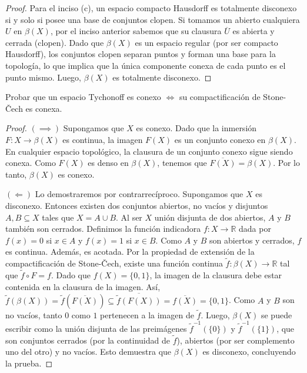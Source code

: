 \documentclass{article}
\theoremstyle{plain}
\theoremstyle{definition}
\newenvironment{ejercicio}[1]{\begin{trivlist}
\item[\hskip \labelsep {\bfseries Ejercicio}\hskip \labelsep {\bfseries #1.}]}{\end{trivlist}}
\begin{document}
\begin{proof}
    Para el inciso (c), un espacio compacto Hausdorff es totalmente disconexo si y solo si posee una base de conjuntos clopen. Si tomamos un abierto cualquiera \( U \) en \( \beta(X) \), por el inciso anterior sabemos que su clausura \( \overline{U} \) es abierta y cerrada (clopen). Dado que \( \beta(X) \) es un espacio regular (por ser compacto Hausdorff), los conjuntos clopen separan puntos y forman una base para la topología, lo que implica que la única componente conexa de cada punto es el punto mismo. Luego, \( \beta(X) \) es totalmente disconexo.
\end{proof}

\begin{ejercicio}{16}
    Probar que un espacio Tychonoff es conexo \( \iff \) su compactificación de Stone-Čech es conexa.
\end{ejercicio}
\begin{proof}
    \( (\implies) \) Supongamos que \( X \) es conexo. Dado que la inmersión \( F: X \to \beta(X) \) es continua, la imagen \( F(X) \) es un conjunto conexo en \( \beta(X) \). En cualquier espacio topológico, la clausura de un conjunto conexo sigue siendo conexa. Como \( F(X) \) es denso en \( \beta(X) \), tenemos que \( \overline{F(X)} = \beta(X) \). Por lo tanto, \( \beta(X) \) es conexo.

    \( (\Longleftarrow) \) Lo demostraremos por contrarrecíproco. Supongamos que \( X \) es disconexo. Entonces existen dos conjuntos abiertos, no vacíos y disjuntos \( A, B \subseteq X \) tales que \( X = A \cup B \). Al ser \( X \) unión disjunta de dos abiertos, \( A \) y \( B \) también son cerrados.
    Definimos la función indicadora \( f: X \to \mathbb{R} \) dada por \( f(x) = 0 \) si \( x \in A \) y \( f(x) = 1 \) si \( x \in B \). Como \( A \) y \( B \) son abiertos y cerrados, \( f \) es continua. Además, es acotada. Por la propiedad de extensión de la compactificación de Stone-Čech, existe una función continua \( \tilde{f}: \beta(X) \to \mathbb{R} \) tal que \( \tilde{f} \circ F = f \).
    Dado que \( f(X) = \{0, 1\} \), la imagen de la clausura debe estar contenida en la clausura de la imagen. Así, \( \tilde{f}(\beta(X)) = \tilde{f}(\overline{F(X)}) \subseteq \overline{\tilde{f}(F(X))} = \overline{f(X)} = \{0, 1\} \).
    Como \( A \) y \( B \) son no vacíos, tanto \( 0 \) como \( 1 \) pertenecen a la imagen de \( \tilde{f} \). Luego, \( \beta(X) \) se puede escribir como la unión disjunta de las preimágenes \( \tilde{f}^{-1}(\{0\}) \) y \( \tilde{f}^{-1}(\{1\}) \), que son conjuntos cerrados (por la continuidad de \( \tilde{f} \)), abiertos (por ser complemento uno del otro) y no vacíos. Esto demuestra que \( \beta(X) \) es disconexo, concluyendo la prueba.
\end{proof}
\end{document}
